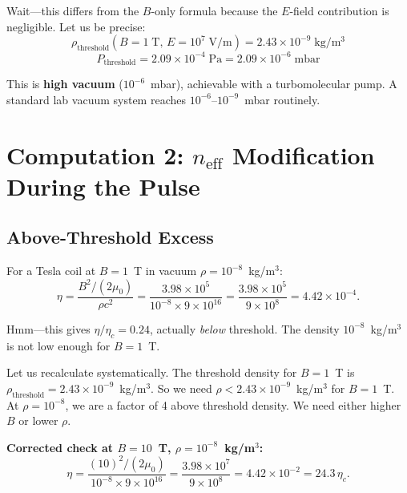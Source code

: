 \documentclass[11pt,a4paper]{article}
\begin{document}
Wait---this differs from the $B$-only formula because the $E$-field contribution is
negligible. Let us be precise:
\begin{equation}
\boxed{\rho_{\mathrm{threshold}}(B=1\;\mathrm{T},\,E=10^7\;\mathrm{V/m})
= 2.43 \times 10^{-9}\;\mathrm{kg/m^3}}
\end{equation}
\begin{equation}
\boxed{P_{\mathrm{threshold}} = 2.09 \times 10^{-4}\;\mathrm{Pa}
= 2.09 \times 10^{-6}\;\mathrm{mbar}}
\end{equation}

This is \textbf{high vacuum} ($10^{-6}$~mbar), achievable with a turbomolecular pump.
A standard lab vacuum system reaches $10^{-6}$--$10^{-9}$~mbar routinely.

\section{Computation 2: $n_{\mathrm{eff}}$ Modification During the Pulse}\label{sec:neff}

\subsection{Above-Threshold Excess}

For a Tesla coil at $B = 1$~T in vacuum $\rho = 10^{-8}$~kg/m$^3$:
\begin{equation}
\eta = \frac{B^2/(2\mu_0)}{\rho c^2} = \frac{3.98 \times 10^5}{10^{-8} \times 9 \times 10^{16}}
= \frac{3.98 \times 10^5}{9 \times 10^8} = 4.42 \times 10^{-4}.
\end{equation}

Hmm---this gives $\eta/\eta_c = 0.24$, actually \emph{below} threshold. The density
$10^{-8}$~kg/m$^3$ is not low enough for $B = 1$~T.

Let us recalculate systematically. The threshold density for $B = 1$~T is
$\rho_{\mathrm{threshold}} = 2.43 \times 10^{-9}$~kg/m$^3$. So we need
$\rho < 2.43 \times 10^{-9}$~kg/m$^3$ for $B = 1$~T. At $\rho = 10^{-8}$, we are
a factor of 4 above threshold density. We need either higher $B$ or lower $\rho$.

\textbf{Corrected check at $B = 10$~T, $\rho = 10^{-8}$~kg/m$^3$:}
\begin{equation}
\eta = \frac{(10)^2/(2\mu_0)}{10^{-8} \times 9 \times 10^{16}}
= \frac{3.98 \times 10^7}{9 \times 10^8} = 4.42 \times 10^{-2}
= 24.3\,\eta_c.
\end{equation}
\end{document}
